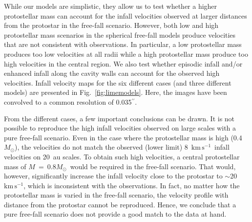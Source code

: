 \documentclass{aa}
\newcommand{\kmpers}{\ensuremath{\mathrm{km \, s^{-1}}}\xspace} %
\newcommand{\about}{$\sim$}                       %
\newcommand{\asec}{$^{\prime \prime}$}
\newcommand{\msun}{\ensuremath{M_{\odot}}\xspace}
\begin{document}

While our models are simplistic, they allow us to test whether a higher protostellar mass can account for the infall velocities observed at larger distances from the protostar in the free-fall scenario. However, both low and high protostellar mass scenarios in the spherical free-fall models produce velocities that are not consistent with observations. In particular, a low protostellar mass produces too low velocities at all radii while a high protostellar mass produce too high velocities in the central region. We also test whether episodic infall and/or enhanced infall along the cavity walls can account for the observed high velocities. Infall velocity maps for the six different cases (and three different models) are presented in Fig.~\ref{fig:limemodels}. Here, the images have been convolved to a common resolution of 0.035\asec.

From the different cases, a few important conclusions can be drawn. It is not possible to reproduce the high infall velocities observed on large scales with a pure free-fall scenario. Even in the case where the protostellar mass is high (0.4\msun), the velocities do not match the observed (lower limit) 8~\kmpers\ infall velocities on 20~au scales. To obtain such high velocities, a central protostellar mass of $M$~=~0.8\msun\ would be required in the free-fall scenario. That would, however, significantly increase the infall velocity close to the protostar to \about 20~\kmpers, which is inconsistent with the observations. In fact, no matter how the protostellar mass is varied in the free-fall scenario, the velocity profile with distance from the protostar cannot be reproduced. Hence, we conclude that a pure free-fall scenario does not provide a good match to the data at hand.
\end{document}
